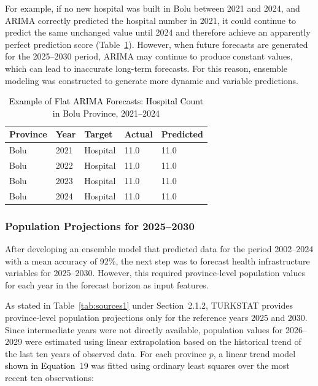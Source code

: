 \documentclass[final, 9pt, twocolumn]{saucis}
\newcommand{\rev}[1]{\textcolor{black}{#1}}
\begin{document}
For example, if no new hospital was built in Bolu between 2021 and 2024, and ARIMA correctly predicted the hospital number in 2021, it could continue to predict the same unchanged value until 2024 and therefore achieve an apparently perfect prediction score (Table~\ref{tab:arima_trap}). However, when future forecasts are generated for the 2025–2030 period, ARIMA may continue to produce constant values, which can lead to inaccurate long-term forecasts. For this reason, ensemble modeling was constructed to generate more dynamic and variable predictions.

\begin{table}[htbp]
\centering
\caption{\rev{Example of Flat ARIMA Forecasts: Hospital Count in Bolu Province, 2021--2024}}
\label{tab:arima_trap}
\small
\begin{tabular}{p{1cm} p{1cm} p{1cm} p{1cm} p{1cm}}
\hline
\textbf{Province} & \textbf{Year} & \textbf{Target} & \textbf{Actual} & \textbf{Predicted} \\
\hline
Bolu & 2021 & Hospital & 11.0 & 11.0 \\
Bolu & 2022 & Hospital & 11.0 & 11.0 \\
Bolu & 2023 & Hospital & 11.0 & 11.0 \\
Bolu & 2024 & Hospital & 11.0 & 11.0 \\
\hline
\end{tabular}
\end{table}

\subsubsection{Population Projections for 2025--2030}

After developing an ensemble model that predicted data for the period 2002--2024 with a mean accuracy of 92\%, the next step was to forecast health infrastructure variables for 2025--2030. However, this required province-level population values for each year in the forecast horizon as input features.

As stated in Table~\ref{tab:sources1} under Section~2.1.2, TURKSTAT provides province-level population projections only for the reference years 2025 and 2030. Since intermediate years were not directly available, population values for 2026--2029 were estimated using linear extrapolation based on the historical trend of the last ten years of observed data. For each province $p$, a linear trend model \rev{shown in Equation~19} was fitted using ordinary least squares over the most recent ten observations:
\end{document}
